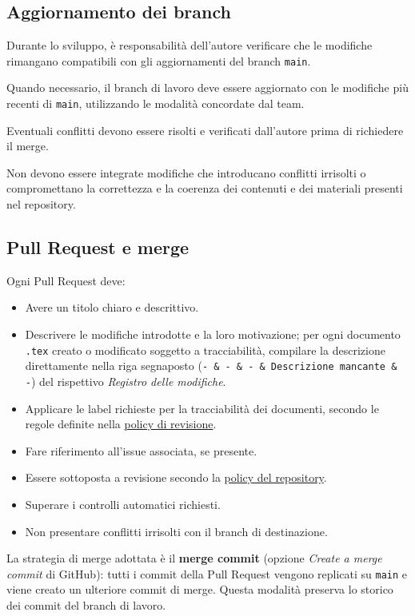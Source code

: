 \documentclass[11pt, a4paper]{article}
\begin{document}
\subsection{Aggiornamento dei branch}

Durante lo sviluppo, è responsabilità dell'autore verificare che le modifiche rimangano compatibili con gli aggiornamenti del branch \texttt{main}.

Quando necessario, il branch di lavoro deve essere aggiornato con le modifiche più recenti di \texttt{main}, utilizzando le modalità concordate dal team.

Eventuali conflitti devono essere risolti e verificati dall'autore prima di richiedere il merge.

Non devono essere integrate modifiche che introducano conflitti irrisolti o compromettano la correttezza e la coerenza dei contenuti e dei materiali presenti nel repository.

\subsection{Pull Request e merge}
\label{subsec:pull-request-e-merge}

Ogni Pull Request deve:
\begin{itemize}
    \item Avere un titolo chiaro e descrittivo.
    \item Descrivere le modifiche introdotte e la loro motivazione; per ogni documento \texttt{.tex} creato o modificato soggetto a tracciabilità, compilare la descrizione direttamente nella riga segnaposto (\texttt{- \& - \& - \& Descrizione mancante \& -}) del rispettivo \textit{Registro delle modifiche}.
    \item Applicare le label richieste per la tracciabilità dei documenti, secondo le regole definite nella \hyperref[subsec:approvazione-e-merge]{policy di revisione}.
    \item Fare riferimento all'issue associata, se presente.
    \item Essere sottoposta a revisione secondo la \hyperref[subsec:regole-generali]{policy del repository}.
    \item Superare i controlli automatici richiesti.
    \item Non presentare conflitti irrisolti con il branch di destinazione.
\end{itemize}

\noindent La strategia di merge adottata è il \textbf{merge commit} (opzione \textit{Create a merge commit} di GitHub): tutti i commit della Pull Request vengono replicati su \texttt{main} e viene creato un ulteriore commit di merge. Questa modalità preserva lo storico dei commit del branch di lavoro.
\end{document}
